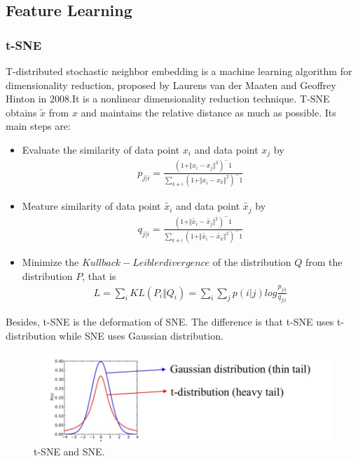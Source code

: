 \documentclass{article}
\begin{document}
\subsection{Feature Learning}
\subsubsection{t-SNE}
\indent T-distributed stochastic neighbor embedding is a machine learning algorithm for dimensionality reduction, proposed by Laurens van der Maaten and Geoffrey Hinton in 2008.\cite{maaten2008visualizing}It is a nonlinear dimensionality reduction technique. T-SNE obtains $\tilde{x}$ from $x$ and maintains the relative distance as much as possible. Its main steps are:
\begin{itemize}
	\item  Evaluate the similarity of data point $x_i$ and data point $x_j$ by
	\begin{eqnarray}
	p_{j|i}=\frac{(1+\Vert x_i-x_j \Vert^2)^-1}{\sum_{k\neq i}(1+\Vert x_i-x_k \Vert^2)^-1}
	\end{eqnarray}
	
	\item  Meature similarity of data point $\tilde{x_i}$ and data point $\tilde{x_j}$ by
	\begin{eqnarray}
	q_{j|i}=\frac{(1+\Vert \tilde{x_i}-\tilde{x_j} \Vert^2)^-1}{\sum_{k\neq i}(1+\Vert \tilde{x_i}-\tilde{x_k} \Vert^2)^-1}
	\end{eqnarray}
	
	\item  Minimize the $Kullback-Leibler divergence$ of the distribution $Q$ from the distribution $P$, that is
	\begin{eqnarray}
	L = \sum_{i}KL(P_i\Vert Q_i)=\sum_{i}\sum_{j}p(i|j)log\frac{p_{j|i}}{q_{j|i}}
	\end{eqnarray}
\end{itemize}

\indent Besides, t-SNE is the deformation of SNE. The difference is that t-SNE uses t-distribution while SNE uses Gaussian distribution.
\begin{figure}[htbp]
	\centering
	\includegraphics[scale=0.3]{figures/SNE.jpg}
	\caption{t-SNE and SNE.}
	\label{fig:SNE}
\end{figure}\par
\end{document}
